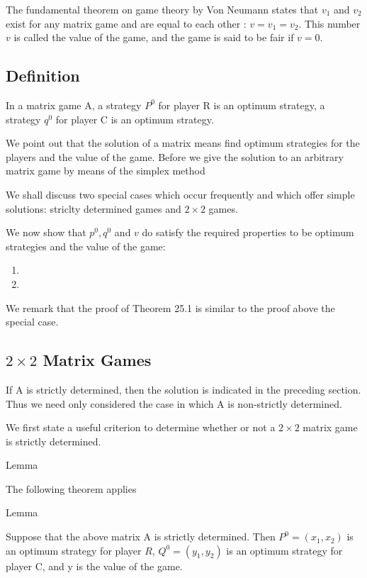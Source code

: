 \documentclass[]{report}
\begin{document}
The fundamental theorem on game theory by Von Neumann states that $v_1$ and $v_2$ exist for any matrix game
and are equal to each other : $v = v_1 = v_2$. This number $v$ is called the value of the game, and the game is said to be fair if $v=0$.


\subsection{Definition}
In a matrix game A, a strategy $P^0$ for player R is an optimum strategy, a strategy $q^0$ for player C is an optimum strategy.

We point out that  the solution of a matrix means find optimum strategies for the players and the value of the game.
Before we give the solution to an arbitrary matrix game by means of the simplex method

We shall discuss two special cases which occur frequently and which offer simple solutions: striclty determined games and $2 \times 2$ games.



We now show that $p^0,q^0$ and $v$ do satisfy the required properties to be optimum strategies and the value of the game:

\begin{enumerate}
\item

\item

\end{enumerate}


We remark that the proof of Theorem 25.1 is similar to the proof above the special case.

\subsection{$2 \times 2$ Matrix Games}


If A is strictly determined, then the solution is indicated in the preceding section. Thus we
need only considered the case in which A is non-strictly determined.

We first state a useful criterion to determine whether or not a $2 \times 2$ matrix game is strictly determined.

Lemma

The following theorem applies

Lemma

Suppose that the above matrix A is strictly determined. Then $P^0 = (x_1,x_2)$ is an optimum strategy for player $R$, $Q^0 = (y_1,y_2)$ is an optimum strategy for player C, and y is the value of the game.
\end{document}
